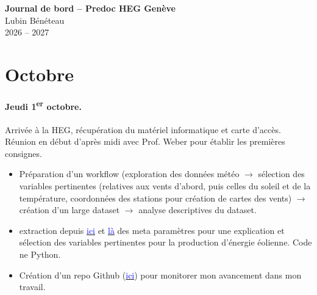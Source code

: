 \documentclass[11pt, a4paper]{article}
\begin{document}
\begin{center}
    {\bfseries\large Journal de bord -- Predoc HEG Genève} \\[0.2cm]
    {\small Lubin Bénéteau}\\[0.2cm]
    {\small 2026 -- 2027}
\end{center}

\section*{Octobre}

\paragraph{Jeudi 1\textsuperscript{er} octobre.} Arrivée à la HEG, récupération du matériel informatique et carte d'accès. Réunion en début d'après midi avec Prof. Weber pour établir les premières consignes. 
\begin{itemize}
    \item Préparation d'un workflow (exploration des données météo $\longrightarrow$ sélection des variables pertinentes (relatives aux vents d'abord, puis celles du soleil et de la température, coordonnées des stations pour création de cartes des vents) $\longrightarrow$ création d'un large dataset $\longrightarrow$ analyse descriptives du dataset.
    \item extraction depuis \href{https://www.meteosuisse.admin.ch/services-et-publications/service/open-data.html#ogd-kw=Vent&ogd-q=&ogd-cat=&ogd-fmt=}{\textcolor{blue}{ici}} et \href{https://github.com/MeteoSwiss/opendata/tree/main/metadata-files}{\textcolor{blue}{là}} des meta paramètres pour une explication et sélection des variables pertinentes pour la production d'énergie éolienne. Code ne Python. 
    \item Création d'un repo Github (\href{https://github.com/LeLubb/Predoc-HEG/tree/main}{\textcolor{blue}{ici}}) pour monitorer mon avancement dans mon travail.
\end{itemize}
\end{document}
